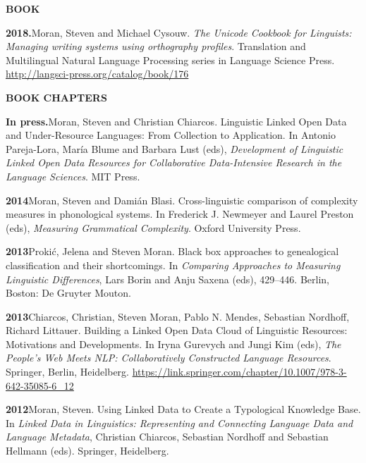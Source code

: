 \documentclass[11pt]{article}
\newcommand{\hangpara}{
 \setlength{\parindent}{0in} %
 \hangindent=0.42in %
}
\begin{document}
\vskip 20pt
\begin{flushleft}
{\bf BOOK}
\end{flushleft}

\hangpara
{\bf 2018.}\hspace{1ex}Moran, Steven and Michael Cysouw. {\it The Unicode Cookbook for Linguists: Managing writing systems using orthography profiles}. Translation and Multilingual Natural Language Processing series in Language Science Press. \url{http://langsci-press.org/catalog/book/176}

\vskip 20pt
\begin{flushleft}
{\bf BOOK CHAPTERS}
\end{flushleft}

\hangpara{\bf In press.}\hspace{1ex}Moran, Steven and Christian Chiarcos. Linguistic Linked Open Data and Under-Resource Languages: From Collection to Application. In Antonio Pareja-Lora, María Blume and Barbara Lust (eds), \textit{Development of Linguistic Linked Open Data Resources for Collaborative Data-Intensive Research in the Language Sciences}. MIT Press.

\vskip 6pt
\hangpara{\bf 2014}\hspace{1ex}Moran, Steven and Dami{\'a}n Blasi. Cross-linguistic comparison of complexity measures in phonological systems. In Frederick J. Newmeyer and Laurel Preston (eds), {\it Measuring Grammatical Complexity}. Oxford University Press. 

\vskip 6pt
\hangpara
{\bf 2013}\hspace{1ex}Proki{\'c}, Jelena and Steven Moran. Black box approaches to genealogical classification and their shortcomings. In {\it Comparing Approaches to Measuring Linguistic Differences}, Lars Borin and Anju Saxena (eds), 429--446. Berlin, Boston: De Gruyter Mouton.

\vskip 6pt
\hangpara
{\bf 2013}\hspace{1ex}Chiarcos, Christian, Steven Moran, Pablo N. Mendes, Sebastian Nordhoff, Richard Littauer. Building a Linked Open Data Cloud of Linguistic Resources: Motivations and Developments. In Iryna Gurevych and Jungi Kim (eds), {\it The People's Web Meets NLP: Collaboratively Constructed Language Resources}. Springer, Berlin, Heidelberg. \url{https://link.springer.com/chapter/10.1007/978-3-642-35085-6_12} %


\vskip 6pt
\hangpara
{\bf 2012}\hspace{1ex}Moran, Steven. Using Linked Data to Create a Typological Knowledge Base. In {\it Linked Data in Linguistics: Representing and Connecting Language Data and Language Metadata}, Christian Chiarcos, Sebastian Nordhoff and Sebastian Hellmann (eds). Springer, Heidelberg.
\end{document}
